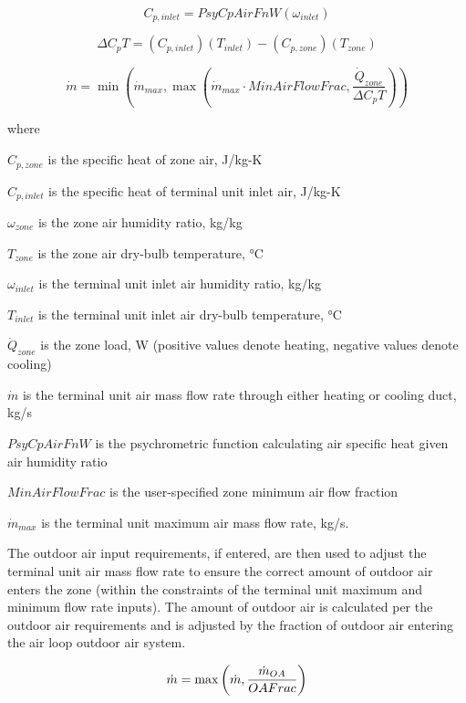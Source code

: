 \begin{equation}
C_{p,inlet} = PsyCpAirFnW\left( {\omega_{inlet}} \right)
\end{equation}

\begin{equation}
\Delta C_p T = \left( {C_{p,inlet}} \right)\left( {{T_{inlet}}} \right) - \left( {C_{p,zone}} \right)\left( {{T_{zone}}} \right)
\end{equation}

\begin{equation}
\dot m = \min \left( \dot m_{max}, \max \left( \dot m_{max}\cdot MinAirFlowFrac,\frac{\dot Q_{zone}}{\Delta C_p T} \right) \right)
\end{equation}

where

\(C_{p,zone}\) is the specific heat of zone air, J/kg-K

\(C_{p,inlet}\) is the specific heat of terminal unit inlet air, J/kg-K

\({\omega_{zone}}\) is the zone air humidity ratio, kg/kg

\({T_{zone}}\) is the zone air dry-bulb temperature, °C

\({\omega_{inlet}}\) is the terminal unit inlet air humidity ratio, kg/kg

\({T_{inlet}}\) is the terminal unit inlet air dry-bulb temperature, °C

\(\dot Q_{zone}\) is the zone load, W (positive values denote heating, negative values denote cooling)

\(\dot m\) is the terminal unit air mass flow rate through either heating or cooling duct, kg/s

\(PsyCpAirFnW\) is the psychrometric function calculating air specific heat given air humidity ratio

\(MinAirFlowFrac\) is the user-specified zone minimum air flow fraction

\({\dot m_{max}}\) is the terminal unit maximum air mass flow rate, kg/s.

The outdoor air input requirements, if entered, are then used to adjust the terminal unit air mass flow rate to ensure the correct amount of outdoor air enters the zone (within the constraints of the terminal unit maximum and minimum flow rate inputs). The amount of outdoor air is calculated per the outdoor air requirements and is adjusted by the fraction of outdoor air entering the air loop outdoor air system.

\begin{equation}
  \dot{m} = \max\PB{ \dot{m}, \frac{\dot{m}_{OA}}{OAFrac} }
\end{equation}

